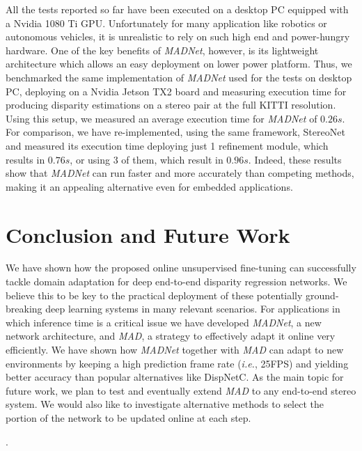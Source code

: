\documentclass[10pt,twocolumn,letterpaper]{article}
\def\ie{\emph{i.e.}}
\def\netname{\emph{MADNet}}
\def\algoname{\emph{MAD}}
\begin{document}
All the tests reported so far have been executed on a desktop PC equipped with a Nvidia 1080 Ti GPU. Unfortunately for many application like robotics or autonomous vehicles, it is unrealistic to rely on such high end and power-hungry hardware.  One of the key benefits of \netname{}, however, is its lightweight architecture which allows an easy deployment on lower power platform.
Thus, we benchmarked the same implementation of \netname{} used for the tests on desktop PC, deploying on a Nvidia Jetson TX2 board and measuring execution time for producing disparity estimations on a stereo pair at the full KITTI resolution. Using this setup, we measured an average execution time for \netname{} of $0.26s$. For comparison, we have re-implemented, using the same framework, StereoNet \cite{khamis2018stereonet} and measured its execution time deploying just 1 refinement module, which results in $0.76s$, or using 3 of them, which result in $0.96s$. Indeed, these results show that \netname{} can run faster and more accurately than competing methods, making it an appealing alternative even for embedded applications.  

\section{Conclusion and Future Work}
\label{sec:conclusion}
We have shown how the proposed online unsupervised fine-tuning can successfully tackle domain adaptation for deep end-to-end disparity regression networks.
We believe this to be key to the practical deployment of these potentially ground-breaking deep learning systems in many relevant scenarios. For applications in which inference time is a critical issue we have developed \netname{}, a new network architecture, and \algoname{}, a strategy to effectively adapt it online very efficiently. We have shown how \netname{} together with \algoname{} can adapt to new environments by keeping a high prediction frame rate (\ie, 25FPS) and yielding better accuracy than popular alternatives like DispNetC. 
As the main topic for future work, we plan to test and eventually extend \algoname{} to any end-to-end stereo system. We would also like to investigate alternative methods to select the portion of the network to be updated online at each step. 


	
{\small


}

\newpage.



\end{document}
